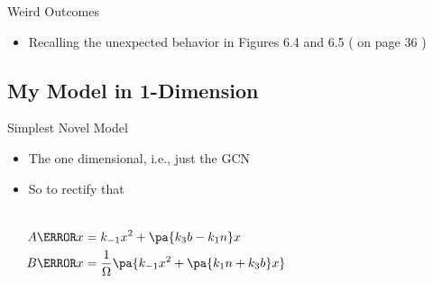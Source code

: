\documentclass[aspectratio=169, onlytextwidth,  notheorems, sOuRcEs, fleqn, leqno, ]{RUCPresentation}
\newcounter{reaction}
\begin{document}
\begin{frame}[t]{ Weird Outcomes }

    \begin{itemize}
        \item Recalling the unexpected behavior in Figures 6.4 and 6.5 ( on page 36 )
    \end{itemize}



\end{frame}

\subsection{My Model in 1-Dimension}
\begin{frame}{Simplest Novel Model}

    \begin{itemize}
        \item The one dimensional, i.e., just the GCN
        \item So to rectify that
    \end{itemize}

    \begin{columns}%

        \column{0.5\framewidth}

        \begin{reactiontable}
        \end{reactiontable}

        \column{0.4\framewidth}

        \begin{align*}
            A\of x &= k_{-1} x^2 + \pa{ k_3 b - k_1 n } x
            \\
            B\of x &= {1 \over \Omega} \pa{k_{-1} x^2 + \pa{ k_1 n + k_3 b } x}
        \end{align*}

    \end{columns}

\end{frame}
\end{document}
